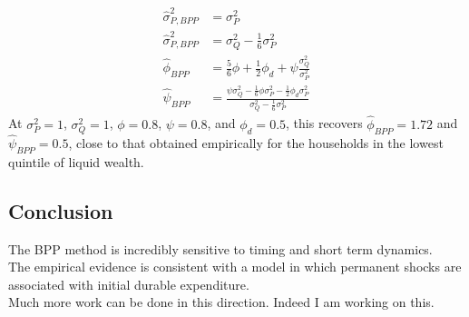 \documentclass[12pt]{article}
\begin{document}
\begin{align*}
	\hat{\sigma}^2_{P,BPP} &= \sigma^2_P \\
	\hat{\sigma}^2_{P,BPP} &= \sigma^2_Q - \frac{1}{6}\sigma^2_P \\
	\hat{\phi}_{BPP} &=  \frac{5}{6}\phi + \frac{1}{2}\phi_d + \psi\frac{\sigma^2_Q}{\sigma^2_P}\\
	\hat{\psi}_{BPP} &=  \frac{\psi \sigma^2_Q - \frac{1}{6} \phi \sigma^2_P - \frac{1}{2}\phi_d\sigma^2_P }{\sigma^2_Q - \frac{1}{6} \sigma^2_P}
\end{align*}
At $\sigma^2_P=1$, $\sigma^2_Q=1$, $\phi=0.8$, $\psi=0.8$, and  $\phi_d=0.5$, this recovers $\hat{\phi}_{BPP}=1.72$ and $\hat{\psi}_{BPP}=0.5$, close to that obtained empirically for the households in the lowest quintile of liquid wealth.

\subsection{Conclusion}
The BPP method is incredibly sensitive to timing and short term dynamics.\\
The empirical evidence is consistent with a model in which permanent shocks are associated with initial durable expenditure. \\
Much more work can be done in this direction. Indeed I am working on this.
	
\end{document}

